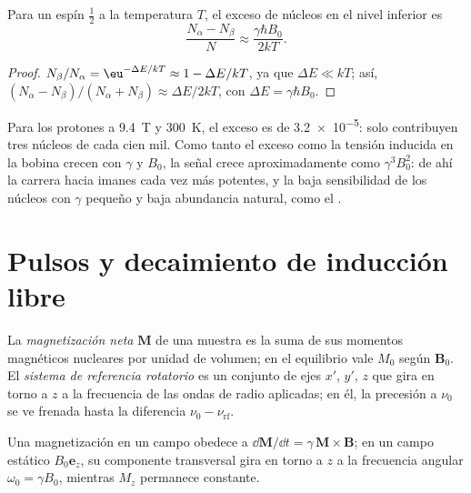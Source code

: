\begin{proposition}\label{prop:b3:advanced-nmr:populations}
Para un espín $\frac12$ a la temperatura $T$, el exceso de núcleos en el nivel inferior es
\[
\frac{N_\alpha - N_\beta}{N} \approx \frac{\gamma\hbar B_0}{2kT}.
\]
\end{proposition}

\begin{proof}
$N_\beta/N_\alpha = \eu^{-\Delta E/kT} \approx 1 - \Delta E/kT$, ya que $\Delta E \ll kT$; así,
$(N_\alpha - N_\beta)/(N_\alpha + N_\beta) \approx \Delta E/2kT$, con $\Delta E = \gamma\hbar B_0$.
\end{proof}

Para los protones a \qty{9.4}{T} y \qty{300}{K}, el exceso es de \num{3.2e-5}: solo
contribuyen tres núcleos de cada cien mil. Como tanto el exceso como la
tensión inducida en la bobina crecen con $\gamma$ y $B_0$, la señal crece
aproximadamente como $\gamma^3B_0^2$: de ahí la carrera hacia imanes cada vez más potentes, y la baja
sensibilidad de los núcleos con $\gamma$ pequeño y baja abundancia natural, como el
.

\section{Pulsos y decaimiento de inducción libre}

\begin{definition}\label{def:b3:advanced-nmr:magnetisation}
La \emph{magnetización neta} $\mathbf M$ de una muestra es la
suma de sus momentos magnéticos nucleares por unidad de volumen; en el equilibrio vale
$M_0$ según $\mathbf B_0$. El \emph{sistema de referencia rotatorio} es un conjunto
de ejes $x'$, $y'$, $z$ que gira en torno a $z$ a la frecuencia de las ondas de radio
aplicadas; en él, la precesión a $\nu_0$ se ve frenada hasta la diferencia $\nu_0 -
\nu_{\mathrm{rf}}$.
\end{definition}

\begin{proposition}[Precesión]\label{prop:b3:advanced-nmr:precession}
Una magnetización en un campo obedece a $\dd\mathbf M/\dd t = \gamma\,\mathbf M\times\mathbf B$; en un
campo estático $B_0\mathbf e_z$, su componente transversal gira en torno a $z$ a la frecuencia
angular $\omega_0 = \gamma B_0$, mientras $M_z$ permanece constante.
\end{proposition}

